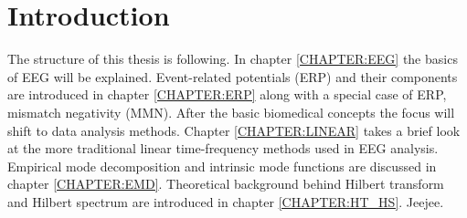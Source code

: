 \chapter{Introduction}


The structure of this thesis is following. In chapter
\ref{CHAPTER:EEG} the basics of EEG will be explained. Event-related
potentials (ERP) and their components are introduced in chapter
\ref{CHAPTER:ERP} along with a special case of ERP, mismatch
negativity (MMN). After the basic biomedical concepts the focus will
shift to data analysis methods. Chapter \ref{CHAPTER:LINEAR} takes a
brief look at the more traditional linear time-frequency methods used
in EEG analysis. Empirical mode decomposition and intrinsic mode
functions are discussed in chapter \ref{CHAPTER:EMD}. Theoretical
background behind Hilbert transform and Hilbert spectrum are
introduced in chapter \ref{CHAPTER:HT_HS}.
Jeejee.
